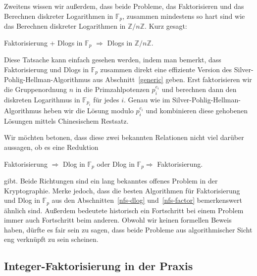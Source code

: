 \begin{refsegment}
Zweitens wissen wir außerdem, dass beide Probleme, das Faktorisieren und das Berechnen diskreter Logarithmen in $\mathbb{F}_p$, zusammen mindestens so hart sind wie das Berechnen diskreter Logarithmen in $\mathbb{Z}/n\mathbb{Z}$. Kurz gesagt:
\begin{center}
  Faktorisierung + Dlogs in $\mathbb{F}_p$ $\Rightarrow$ Dlogs in $\mathbb{Z}/n\mathbb{Z}$.
\end{center}
Diese Tatsache kann einfach gesehen werden, indem man bemerkt, dass Faktorisierung und Dlogs in $\mathbb{F}_p$ zusammen direkt eine effiziente Version des Silver-Pohlig-Hellman-Algorithmus aus Abschnitt~\ref{generic} geben. Erst faktorisieren wir die Gruppenordnung $n$ in die Primzahlpotenzen $p_i^{e_i}$ und berechnen dann den diskreten Logarithmus in $\mathbb{F}_{p_i}$ für jedes $i$. Genau wie im Silver-Pohlig-Hellman-Algorithmus heben wir die Lösung modulo $p_i^{e_i}$ und kombinieren diese gehobenen Lösungen mittels Chinesischem Restsatz.

Wir möchten betonen, dass diese zwei bekannten Relationen nicht viel darüber aussagen, ob es eine Reduktion
\begin{center}
  Faktorisierung $\Rightarrow$ Dlog in $\mathbb{F}_p$ \hskip 1cm oder \hskip 1cm Dlog in $\mathbb{F}_p \Rightarrow $ Faktorisierung.
\end{center}
gibt.
Beide Richtungen sind ein lang bekanntes offenes Problem in der Kryptographie. Merke jedoch, dass die besten Algorithmen für Faktorisierung und Dlog in $\mathbb{F}_p$ aus den Abschnitten~\ref{nfs-dlog} und~\ref{nfs-factor} bemerkenswert ähnlich sind. Außerdem bedeutete historisch ein Fortschritt bei einem Problem immer auch Fortschritt beim anderen. Obwohl wir keinen formellen Beweis haben, dürfte es fair sein zu sagen, dass beide Probleme aus algorithmischer Sicht eng verknüpft zu sein scheinen.


\subsection{Integer-Faktorisierung in der Praxis}


\end{refsegment}
